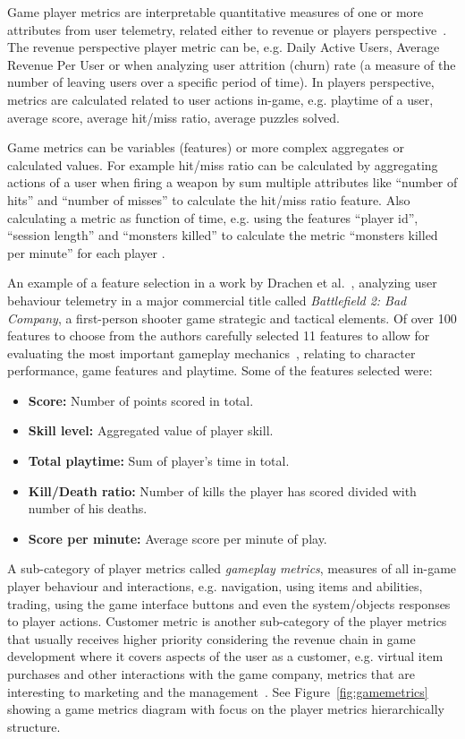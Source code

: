 Game player metrics are interpretable quantitative measures of one or more attributes from user telemetry, related either to revenue or players perspective~\citep{Drachen:2013Basics}. The revenue perspective player metric can be, e.g. Daily Active Users, Average Revenue Per User or when analyzing user attrition (churn) rate (a measure of the number of leaving users over a specific period of time). In players perspective, metrics are calculated related to user actions in-game, e.g. playtime of a user, average score, average hit/miss ratio, average puzzles solved. 

Game metrics can be variables (features) or more complex aggregates or calculated values. For example hit/miss ratio can be calculated by aggregating actions of a user when firing a weapon by sum multiple attributes like ``number of hits'' and ``number of misses'' to calculate the hit/miss ratio feature. Also calculating a metric as function of time, e.g. using the features ``player id'', ``session length'' and ``monsters killed'' to calculate the metric ``monsters killed per minute'' for each player \citep{Drachen:2013Basics}.

An example of a feature selection in a work by Drachen et al.~\citep{Drachen:2012}, analyzing user behaviour telemetry in a major commercial title called \textit{Battlefield 2: Bad Company}, a first-person shooter game strategic and tactical elements. Of over 100 features to choose from the authors carefully selected 11 features to allow for evaluating the most important gameplay mechanics~\citep{Drachen:2009Tomb}, relating to character performance, game features and playtime. Some of the features selected were:
\begin{itemize}
\item \textbf{Score:} Number of points scored in total.
\item \textbf{Skill level:} Aggregated value of player skill.
\item \textbf{Total playtime:} Sum of player's time in total.
\item \textbf{Kill/Death ratio:} Number of kills the player has scored divided with number of his deaths.
\item \textbf{Score per minute:} Average score per minute of play.
\end{itemize}

A sub-category of player metrics called \textit{gameplay metrics}, measures of all in-game player behaviour and interactions, e.g. navigation, using items and abilities, trading, using the game interface buttons and even the system/objects responses to player actions. Customer metric is another sub-category of the player metrics that usually receives higher priority considering the revenue chain in game development where it covers aspects of the user as a customer, e.g. virtual item purchases and other interactions with the game company, metrics that are interesting to marketing and the management~\citep{Drachen:2013Basics}. See Figure~\ref{fig:gamemetrics} showing a game metrics diagram with focus on the player metrics hierarchically structure.

